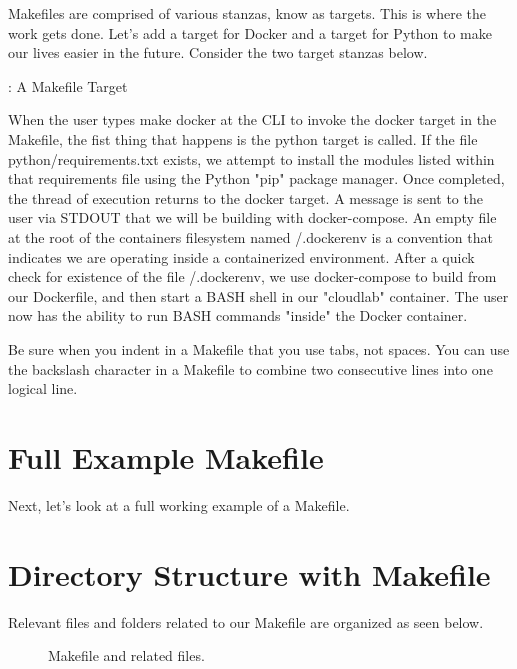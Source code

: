 \justify
Makefiles are comprised of various stanzas, know as targets. This is
where the work gets done. Let's add a target for Docker and a target for
Python to make our lives easier in the future. Consider the two target
stanzas below.

\justify
\begin{mybox}{\thetcbcounter: A Makefile Target}
	
\end{mybox}

\justify
When the user types make docker at the CLI to invoke the docker target
in the Makefile, the fist thing that happens is the python target is
called. If the file python/requirements.txt exists, we attempt to
install the modules listed within that requirements file using the
Python "pip" package manager. Once completed, the thread of execution
returns to the docker target. A message is sent to the user via STDOUT
that we will be building with docker-compose. An empty file at the root
of the containers filesystem named /.dockerenv is a convention that
indicates we are operating inside a containerized environment. After a
quick check for existence of the file /.dockerenv, we use docker-compose
to build from our Dockerfile, and then start a BASH shell in our
"cloudlab" container. The user now has the ability to run BASH commands
"inside" the Docker container.

\justify
Be sure when you indent in a Makefile that you use tabs, not spaces. You
can use the backslash character in a Makefile to combine two consecutive
lines into one logical line.

\section{Full Example Makefile}

\justify
Next, let's look at a full working example of a Makefile.

\section{Directory Structure with Makefile}

\justify
Relevant files and folders related to our Makefile are organized as seen
below.

\begin{figure}[!htb]
	
	\caption{Makefile and related files.}
\end{figure}
